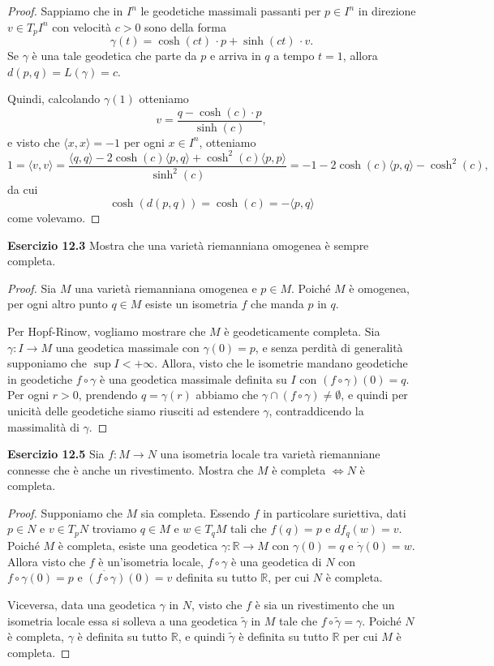 \documentclass[a4paper]{article}
\newcommand{\R}{\mathbb{R}}
\theoremstyle{definition}
\theoremstyle{definition}
\theoremstyle{remark}
\theoremstyle{definition}
\begin{document}
\begin{proof}
	Sappiamo che in $I^n$ le geodetiche massimali passanti per $p\in I^n$ in direzione $v\in T_pI^n$ con velocità $c>0$ sono della forma
	\[
		\gamma(t) = \cosh (ct) \,\cdot p + \sinh (ct) \,\cdot v.
	\]
	Se $\gamma$ è una tale geodetica che parte da $p$ e arriva in $q$ a tempo $t=1$, allora $d(p, q) = L(\gamma) = c$.

	Quindi, calcolando $\gamma(1)$ otteniamo
	\[
		v= \frac{q-\cosh(c)\cdot p}{\sinh(c)},
	\]
	e visto che $\langle x, x \rangle = -1$ per ogni $x \in I^n$, otteniamo
	\[
		1 = \langle v, v \rangle = \frac{\langle q, q \rangle - 2\cosh(c)\langle p, q \rangle + \cosh^2(c)\langle p, p \rangle}{\sinh^2(c)} = -1 - 2\cosh(c)\langle p, q \rangle - \cosh^2(c),
	\]
	da cui \[\cosh(d(p,q))=\cosh(c) = -\langle p, q \rangle\] come volevamo.
\end{proof}

\textbf{Esercizio 12.3}
Mostra che una varietà riemanniana omogenea è sempre completa.
\begin{proof}
	Sia $M$ una varietà riemanniana omogenea e $p \in M$. Poiché $M$ è omogenea, per ogni altro punto $q\in M$ esiste un isometria $f$ che manda $p$ in $q$.

	Per Hopf-Rinow, vogliamo mostrare che $M$ è geodeticamente completa. Sia $\gamma: I \to M$ una geodetica massimale con $\gamma(0)=p$, e senza perdità di generalità supponiamo che $\sup I < +\infty$. Allora, visto che le isometrie mandano geodetiche in geodetiche $f\circ \gamma$ è una geodetica massimale definita su $I$ con $(f\circ \gamma)(0)=q$. Per ogni $r>0$, prendendo $q=\gamma(r)$ abbiamo che $\gamma\cap (f\circ \gamma)\neq \emptyset$, e quindi per unicità delle geodetiche siamo riusciti ad estendere $\gamma$, contraddicendo la massimalità di $\gamma$.
\end{proof}

\textbf{Esercizio 12.5}
Sia $f: M \to N$ una isometria locale tra varietà riemanniane connesse che è anche un rivestimento. Mostra che $M$ è completa $\iff N$ è completa.
\begin{proof}
	Supponiamo che $M$ sia completa. Essendo $f$ in particolare suriettiva, dati $p\in N$ e $v\in T_p N$ troviamo $q\in M$ e $w\in T_q M$ tali che $f(q)=p$ e $df_q(w)=v$. Poiché $M$ è completa, esiste una geodetica $\gamma: \R \to M$ con $\gamma(0)=q$ e $\dot{\gamma}(0)=w$. Allora visto che $f$ è un'isometria locale, $f\circ \gamma$ è una geodetica di $N$ con $f\circ \gamma(0)=p$ e $\dot{(f\circ \gamma)}(0)=v$ definita su tutto $\R$, per cui $N$ è completa.

	Viceversa, data una geodetica $\gamma$ in $N$, visto che $f$ è sia un rivestimento che un isometria locale essa si solleva a una geodetica $\tilde{\gamma}$ in $M$ tale che $f\circ \tilde{\gamma} = \gamma$. Poiché $N$ è completa, $\gamma$ è definita su tutto $\R$, e quindi $\tilde{\gamma}$ è definita su tutto $\R$ per cui $M$ è completa.
\end{proof}
\end{document}
